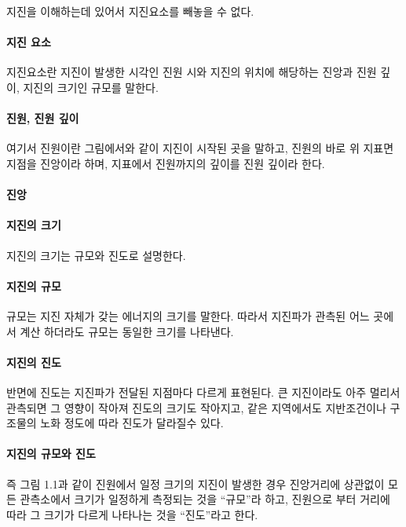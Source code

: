 \documentclass[12pt, a4paper, oneside]{book}
\begin{document}
		지진을 이해하는데 있어서 지진요소를 빼놓을 수 없다.
		
		\paragraph{지진 요소}
		지진요소란 지진이 발생한 시각인 진원 시와 지진의 위치에 해당하는 진앙과 진원 깊이, 지진의 크기인 규모를 말한다.
		
		\paragraph{진원, 진원 깊이}
		여기서 진원이란 그림에서와 같이 지진이 시작된 곳을 말하고, 진원의 바로 위 지표면 지점을 진앙이라 하며, 지표에서 진원까지의 깊이를 진원 깊이라 한다.
		
		\paragraph{진앙}
		
		
		\paragraph{지진의 크기}
		지진의 크기는 규모와 진도로 설명한다.

		\paragraph{지진의 규모}
		규모는 지진 자체가 갖는 에너지의 크기를 말한다.
		따라서 지진파가 관측된 어느 곳에서 계산 하더라도 규모는 동일한 크기를 나타낸다.
		
		\paragraph{지진의 진도}
		반면에 진도는 지진파가 전달된 지점마다 다르게 표현된다.
		큰 지진이라도 아주 멀리서 관측되면 그 영향이 작아져 진도의 크기도 작아지고, 같은 지역에서도 지반조건이나 구조물의 노화 정도에 따라 진도가 달라질수 있다.
		
		\paragraph{지진의 규모와 진도}
		즉 그림 1.1과 같이 진원에서 일정 크기의 지진이 발생한 경우 진앙거리에 상관없이 모든 관측소에서 크기가 일정하게 측정되는 것을 ``규모''라 하고, 진원으로 부터 거리에 따라 그 크기가 다르게 나타나는 것을 ``진도''라고 한다.
		
		
	
\end{document}
